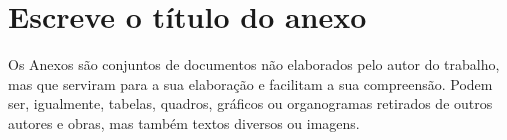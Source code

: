 
\chapter{Escreve o título do anexo} %

\label{Annex1} %

Os Anexos são conjuntos de documentos não elaborados pelo autor do trabalho, mas que serviram para a sua elaboração e facilitam a sua compreensão. Podem ser, igualmente, tabelas, quadros, gráficos ou organogramas retirados de outros autores e obras, mas também textos diversos ou imagens.